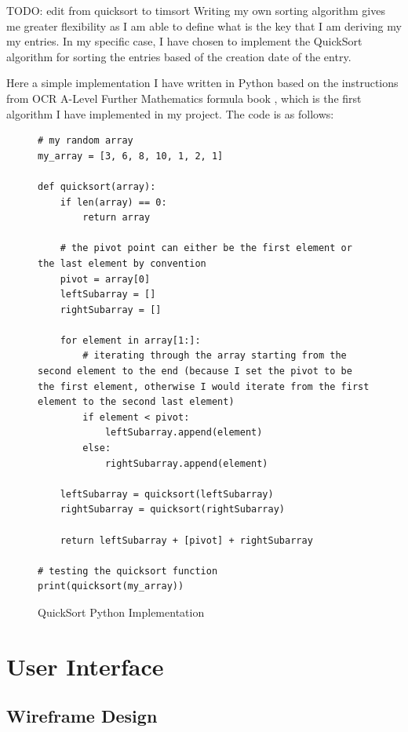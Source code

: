 TODO: edit from quicksort to timsort
Writing my own sorting algorithm gives me greater flexibility as I am able to define what is the key that I am deriving my my entries. In my specific case, I have chosen to implement the QuickSort algorithm for sorting the entries based of the creation date of the entry. 

Here a simple implementation I have written in Python based on the instructions from OCR A-Level Further Mathematics formula book \cite{ocr2019furthermaths}, which is the first algorithm I have implemented in my project. The code is as follows:
\newpage
\begin{figure}[H]
\begin{verbatim}
# my random array
my_array = [3, 6, 8, 10, 1, 2, 1]

def quicksort(array):
    if len(array) == 0:
        return array

    # the pivot point can either be the first element or the last element by convention
    pivot = array[0]
    leftSubarray = []
    rightSubarray = []

    for element in array[1:]:
        # iterating through the array starting from the second element to the end (because I set the pivot to be the first element, otherwise I would iterate from the first element to the second last element)
        if element < pivot:
            leftSubarray.append(element)
        else:
            rightSubarray.append(element)

    leftSubarray = quicksort(leftSubarray)
    rightSubarray = quicksort(rightSubarray)

    return leftSubarray + [pivot] + rightSubarray

# testing the quicksort function
print(quicksort(my_array))
\end{verbatim}
        \caption{QuickSort Python Implementation}
\end{figure}








\section{User Interface}
\subsection{Wireframe Design}

